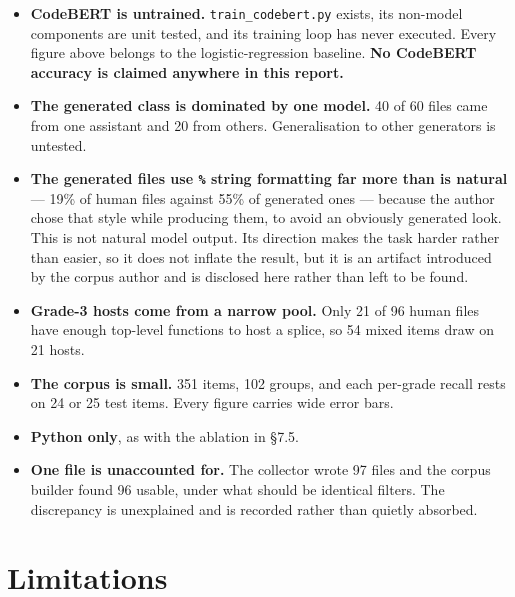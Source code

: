 \begin{itemize}
\tightlist
\item
  \textbf{CodeBERT is untrained.} \texttt{train\_codebert.py} exists,
  its non-model components are unit tested, and its training loop has
  never executed. Every figure above belongs to the logistic-regression
  baseline. \textbf{No CodeBERT accuracy is claimed anywhere in this
  report.}
\item
  \textbf{The generated class is dominated by one model.} 40 of 60 files
  came from one assistant and 20 from others. Generalisation to other
  generators is untested.
\item
  \textbf{The generated files use \texttt{\%} string formatting far more
  than is natural} --- 19\% of human files against 55\% of generated
  ones --- because the author chose that style while producing them, to
  avoid an obviously generated look. This is not natural model output.
  Its direction makes the task harder rather than easier, so it does not
  inflate the result, but it is an artifact introduced by the corpus
  author and is disclosed here rather than left to be found.
\item
  \textbf{Grade-3 hosts come from a narrow pool.} Only 21 of 96 human
  files have enough top-level functions to host a splice, so 54 mixed
  items draw on 21 hosts.
\item
  \textbf{The corpus is small.} 351 items, 102 groups, and each
  per-grade recall rests on 24 or 25 test items. Every figure carries
  wide error bars.
\item
  \textbf{Python only}, as with the ablation in \S{}7.5.
\item
  \textbf{One file is unaccounted for.} The collector wrote 97 files and
  the corpus builder found 96 usable, under what should be identical
  filters. The discrepancy is unexplained and is recorded rather than
  quietly absorbed.
\end{itemize}

\hypertarget{limitations}{%
\section{Limitations}\label{limitations}}

